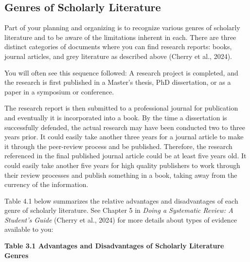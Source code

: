 \documentclass[
  letterpaper,
  DIV=11,
  numbers=noendperiod]{scrreprt}
\begin{document}
\subsection*{Genres of Scholarly
Literature}\label{genres-of-scholarly-literature}

Part of your planning and organizing is to recognize various genres of
scholarly literature and to be aware of the limitations inherent in
each. There are three distinct categories of documents where you can
find research reports: books, journal articles, and grey literature as
described above (Cherry et al., 2024).

You will often see this sequence followed: A research project is
completed, and the research is first published in a Master's thesis, PhD
dissertation, or as a paper in a symposium or conference.

The research report is then submitted to a professional journal for
publication and eventually it is incorporated into a book. By the time a
dissertation is successfully defended, the actual research may have been
conducted two to three years prior. It could easily take another three
years for a journal article to make it through the peer-review process
and be published. Therefore, the research referenced in the final
published journal article could be at least five years old. It could
easily take another five years for high quality publishers to work
through their review processes and publish something in a book, taking
away from the currency of the information.

Table 4.1 below summarizes the relative advantages and disadvantages of
each genre of scholarly literature. See Chapter 5 in \emph{Doing a
Systematic Review: A Student's Guide} (Cherry et al., 2024) for more
details about types of evidence available to you:

\textbf{Table 3.1 Advantages and Disadvantages of Scholarly Literature
Genres}
\end{document}
